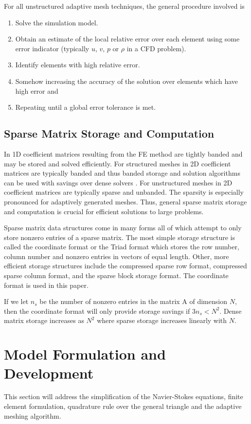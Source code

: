 \documentclass[wrr]{agutex}  %
\begin{document}
\begin{article}
For all unstructured adaptive mesh techniques, the general procedure involved is

\begin{enumerate}
\item Solve the  simulation model.
\item Obtain an estimate of the local relative error over each element using some error indicator (typically $u$, $v$, $p$ or $\rho$ in a CFD problem).
\item Identify elements with high relative error.
\item Somehow increasing the accuracy of the solution over elements which have high error and 
\item Repeating until a global error tolerance is met.
\end{enumerate}

\subsection{Sparse Matrix Storage and Computation} \label{sec:sparse}
In 1D coefficient matrices resulting from the FE method are tightly banded and may be stored and solved efficiently.  For structured meshes in 2D coefficient matrices are typically banded and thus banded storage and solution algorithms can be used with savings over dense solvers \citep{Burkardt2005c}.  For unstructured meshes in 2D coefficient matrices are typically sparse and unbanded.  The sparsity is especially pronounced for adaptively generated meshes. Thus, general sparse matrix storage and computation is crucial for efficient solutions to large problems.  

Sparse matrix data structures come in many forms all of which attempt to only store nonzero entries of a sparse matrix.  The most simple storage structure is called the coordinate format or the Triad format \citep{Anderson1999} which stores the row number, column number and nonzero entries in vectors of equal length.  Other, more efficient storage structures include the compressed sparse row format, compressed sparse column format, and the sparse block storage format.  The coordinate format is used in this paper.  

If we let $n_s$ be the number of nonzero entries in the matrix A of dimension $N$, then the coordinate format will only provide storage savings if $3n_s<N^2$.  Dense matrix storage increases as $N^2$ where sparse storage increases linearly with $N$.

 
\section{Model Formulation and Development}
This section will address the simplification of the Navier-Stokes equations, finite element formulation, quadrature rule over the general triangle and the adaptive meshing algorithm.  

\end{article}
\end{document}
